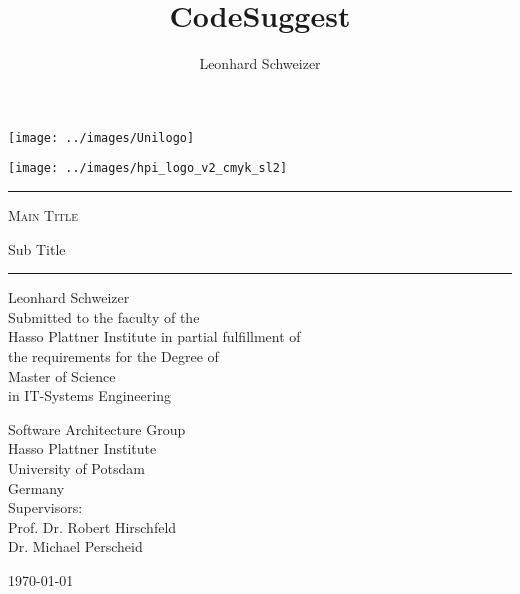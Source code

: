 \title{CodeSuggest}
\author{Leonhard Schweizer}
\begin{titlepage}
\pagestyle{empty}

\noindent
\begin{minipage}[b]{0.4\linewidth}
\noindent
\texttt{[image: ../images/Unilogo]}
\end{minipage}
\hfill
\begin{minipage}[b]{0.4\linewidth}
\hfill
\vspace{3mm}
\texttt{[image: ../images/hpi\_logo\_v2\_cmyk\_sl2]}
\end{minipage}

\vspace{2cm}

\begin{center}
\begin{minipage}{0.7\textwidth}
\begin{center}
\begin{large}
\hrule
\vspace{2em}
\textsc{\Huge Main Title \\[0.5em]}
\begin{doublespace}
  {\LARGE Sub Title}
  \\[1.2em]
\end{doublespace}
\hrule
\vspace{1.5cm}

{\huge Leonhard Schweizer } \\[1.5cm]

Submitted to the faculty of the \\
Hasso Plattner Institute in partial fulfillment of \\
the requirements for the Degree of \\[5mm]
{\Large Master of Science} \\[1mm]
in IT-Systems Engineering \\[2cm]

\begin{multicols}{2}
Software Architecture Group\\
Hasso Plattner Institute\\
University of Potsdam \\
Germany \\
Supervisors: \\
Prof. Dr. Robert Hirschfeld \\
Dr. Michael Perscheid \\
\end{multicols}
\end{large}
\end{center}
\end{minipage}
\vfill
{\LARGE \today \\ ~ }
\end{center}
\end{titlepage}
\restoregeometry
\cleardoublepage